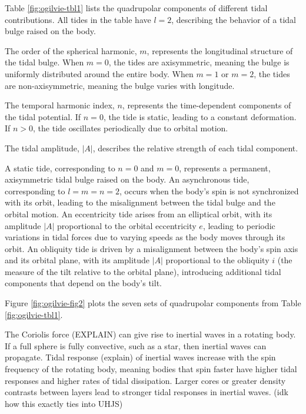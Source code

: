 \documentclass[oneside,12pt]{amsart}
\numberwithin{page}{section}
\begin{document}

Table \ref{fig:ogilvie-tbl1} lists the quadrupolar components of different tidal contributions. All tides in the table have $l=2$, describing the behavior of a tidal bulge raised on the body.

The order of the spherical harmonic, $m$, represents the longitudinal structure of the tidal bulge. When $m=0$, the tides are axisymmetric, meaning the bulge is uniformly distributed around the entire body. When $m=1$ or $m=2$, the tides are non-axisymmetric, meaning the bulge varies with longitude.

The temporal harmonic index, $n$, represents the time-dependent components of the tidal potential. If $n=0$, the tide is static, leading to a constant deformation. If $n>0$, the tide oscillates periodically due to orbital motion.

The tidal amplitude, $|A|$, describes the relative strength of each tidal component. 

A static tide, corresponding to $n=0$ and $m=0$, represents a permanent, axisymmetric tidal bulge raised on the body. An asynchronous tide, corresponding to $l=m=n=2$, occurs when the body's spin is not synchronized with its orbit, leading to the misalignment between the tidal bulge and the orbital motion. An eccentricity tide arises from an elliptical orbit, with its amplitude $|A|$ proportional to the orbital eccentricity $e$, leading to periodic variations in tidal forces due to varying speeds as the body moves through its orbit. An obliquity tide is driven by a misalignment between the body's spin axis and its orbital plane, with its amplitude $|A|$ proportional to the obliquity $i$ (the measure of the tilt relative to the orbital plane), introducing additional tidal components that depend on the body's tilt.

Figure \ref{fig:ogilvie-fig2} plots the seven sets of quadrupolar components from Table \ref{fig:ogilvie-tbl1}. 


The Coriolis force (EXPLAIN) can give rise to inertial waves in a rotating body. If a full sphere is fully convective, such as a star, then inertial waves can propagate. Tidal response (explain) of inertial waves increase with the spin frequency of the rotating body, meaning bodies that spin faster have higher tidal responses and higher rates of tidal dissipation. Larger cores or greater density contrasts between layers lead to stronger tidal responses in inertial waves. (idk how this exactly ties into UHJS)
\end{document}
